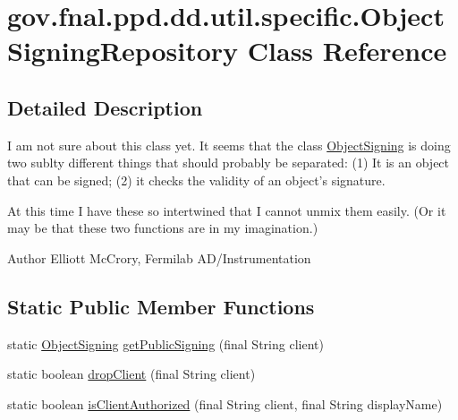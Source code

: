 \hypertarget{classgov_1_1fnal_1_1ppd_1_1dd_1_1util_1_1specific_1_1ObjectSigningRepository}{\section{gov.\-fnal.\-ppd.\-dd.\-util.\-specific.\-Object\-Signing\-Repository Class Reference}
\label{classgov_1_1fnal_1_1ppd_1_1dd_1_1util_1_1specific_1_1ObjectSigningRepository}
}


\subsection{Detailed Description}
I am not sure about this class yet. It seems that the class \hyperlink{classgov_1_1fnal_1_1ppd_1_1dd_1_1util_1_1specific_1_1ObjectSigning}{Object\-Signing} is doing two sublty different things that should probably be separated\-: (1) It is an object that can be signed; (2) it checks the validity of an object's signature. 

At this time I have these so intertwined that I cannot unmix them easily. (Or it may be that these two functions are in my imagination.) 

\begin{DoxyAuthor}{Author}
Elliott Mc\-Crory, Fermilab A\-D/\-Instrumentation 
\end{DoxyAuthor}
\subsection*{Static Public Member Functions}
\begin{DoxyCompactItemize}
\item 
static \hyperlink{classgov_1_1fnal_1_1ppd_1_1dd_1_1util_1_1specific_1_1ObjectSigning}{Object\-Signing} \hyperlink{classgov_1_1fnal_1_1ppd_1_1dd_1_1util_1_1specific_1_1ObjectSigningRepository_a5b1c846be39df313c60ca26183a89027}{get\-Public\-Signing} (final String client)
\item 
static boolean \hyperlink{classgov_1_1fnal_1_1ppd_1_1dd_1_1util_1_1specific_1_1ObjectSigningRepository_aaa4803138869f8eb5ff005c8fa6ca820}{drop\-Client} (final String client)
\item 
static boolean \hyperlink{classgov_1_1fnal_1_1ppd_1_1dd_1_1util_1_1specific_1_1ObjectSigningRepository_a222eaa12e64386f9d0712169468b6412}{is\-Client\-Authorized} (final String client, final String display\-Name)
\end{DoxyCompactItemize}


